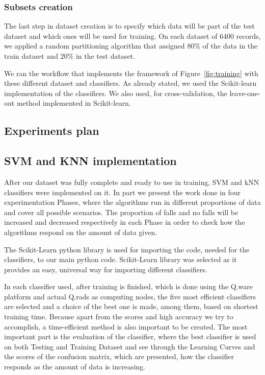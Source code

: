 \documentclass[10pt, conference, compsocconf]{IEEEtran}
\begin{document}
\subsubsection{Subsets creation}

The last step in dataset creation is to specify which data will be part of the test dataset and which ones will be used for 
training. On each dataset of $6400$ records, we applied a random partitioning algorithm that assigned $80$\% of the data 
in the train dataset and $20$\% in the test dataset. 

We ran the workflow that implements the framework of Figure~\ref{fig:training} with these different dataset and classifiers. 
As already stated, we used the Scikit-learn implementation of the classifiers. We also used, for cross-validation, the leave-one-out 
method implemented in Scikit-learn. 


\subsection{Experiments plan}


\subsection{SVM and KNN implementation}

After our dataset was fully complete and ready to use in training, SVM and kNN classifiers were implemented on it. In part we present the work done in four experimentation Phases, where the algorithms run in different proportions of data and cover all possible scenarios. The proportion of falls and no falls will be increased and decreased respectively in each Phase in order to check how the algorithms respond on the amount of data given.

The Scikit-Learn python library is used for importing the code, needed for the classifiers, to our main python code. Scikit-Learn library was selected as it provides an easy, universal way for importing different classifiers. 

In each classifier used, after training is finished, which is done using the Q.ware platform and actual Q.rads as computing nodes, the five most efficient classifiers are selected and a choice of the best one is made, among them, based on shortest training time. Because apart from the scores and high accuracy we try to accomplish, a time-efficient method is also important to be created. The most important part is the evaluation of the classifier, where the best classifier is used on both Testing and Training Dataset and see through the Learning Curves and the scores of the confusion matrix, which are presented, how the classifier responds as the amount of data is increasing. 
\end{document}
